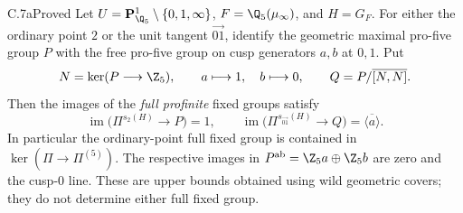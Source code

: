 \begin{claim}{C.7a}{Proved}
Let $U=\mathbf P^1_{\Q_5}\setminus\{0,1,\infty\}$,
$F=\Q_5(\mu_\infty)$, and $H=G_F$. For either the ordinary point $2$
or the unit tangent $\overrightarrow{01}$, identify the geometric maximal
pro-five group $P$ with the free pro-five group on cusp generators $a,b$
at $0,1$. Put
\[
 N=\ker(P\longrightarrow\Z_5),\qquad a\longmapsto1,\quad b\longmapsto0,
 \qquad Q=P/\overline{[N,N]}.
\]
Then the images of the \emph{full profinite} fixed groups satisfy
\[
 \operatorname{im}\bigl(\Pi^{s_2(H)}\to P\bigr)=1,
 \qquad
 \operatorname{im}\bigl(\Pi^{s_{\overrightarrow{01}}(H)}\to Q\bigr)
 =\overline{\langle a\rangle}.
\]
In particular the ordinary-point full fixed group is contained in
$\ker(\Pi\to\Pi^{(5)})$. The respective images in
$P^{\rm ab}=\Z_5a\oplus\Z_5b$ are zero and the cusp-$0$ line. These are upper bounds obtained using
wild geometric covers; they do not determine either full fixed group.
\end{claim}
